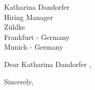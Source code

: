 \documentclass[10pt,letter]{letter}
\def\hm{Katharina Dandorfer } %
\begin{document}
    \begin{letter}{\hm \\ Hiring Manager \\ Zühlke \\Frankfurt - Germany \\   Munich - Germany }
\opening{Dear \hm,}

\setlength\parindent{.5in}



 

\closing{Sincerely,}
\end{letter}
\end{document}
